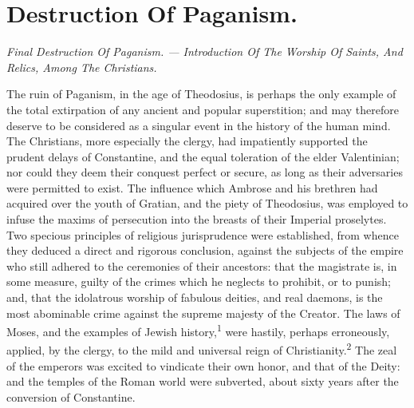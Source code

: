\chapter{Destruction Of Paganism.}

\textit{Final Destruction Of Paganism. — Introduction Of The Worship Of
Saints, And Relics, Among The Christians.}

The ruin of Paganism, in the age of Theodosius, is perhaps the
only example of the total extirpation of any ancient and popular
superstition; and may therefore deserve to be considered as a
singular event in the history of the human mind. The Christians,
more especially the clergy, had impatiently supported the prudent
delays of Constantine, and the equal toleration of the elder
Valentinian; nor could they deem their conquest perfect or
secure, as long as their adversaries were permitted to exist. The
influence which Ambrose and his brethren had acquired over the
youth of Gratian, and the piety of Theodosius, was employed to
infuse the maxims of persecution into the breasts of their
Imperial proselytes. Two specious principles of religious
jurisprudence were established, from whence they deduced a direct
and rigorous conclusion, against the subjects of the empire who
still adhered to the ceremonies of their ancestors: that the
magistrate is, in some measure, guilty of the crimes which he
neglects to prohibit, or to punish; and, that the idolatrous
worship of fabulous deities, and real daemons, is the most
abominable crime against the supreme majesty of the Creator. The
laws of Moses, and the examples of Jewish history,\textsuperscript{1} were
hastily, perhaps erroneously, applied, by the clergy, to the mild
and universal reign of Christianity.\textsuperscript{2} The zeal of the emperors
was excited to vindicate their own honor, and that of the Deity:
and the temples of the Roman world were subverted, about sixty
years after the conversion of Constantine.



